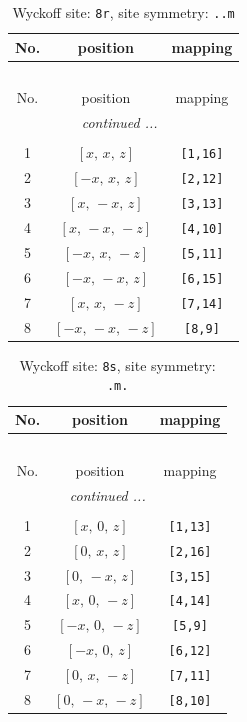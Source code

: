 \documentclass[fleqn,8pt]{jsarticle}
\begin{document}
\begin{longtable}{ccc}
\caption{Wyckoff site: {\tt 8r}, site symmetry: {\tt ..m}}
 \\
 \hline \hline
No. & position & mapping \\ \hline \endfirsthead

\multicolumn{2}{l}{\tablename\ \thetable{}} \\
 \hline \hline
No. & position & mapping \\ \hline \endhead

 \hline \hline
\multicolumn{2}{r}{\footnotesize\it continued ...} \\ \endfoot

 \hline \hline
\multicolumn{2}{r}{} \\ \endlastfoot

1 & $\left[ x,\, x,\, z \right]$ & {\tt [1,16]} \\ \hline
2 & $\left[ - x,\, x,\, z \right]$ & {\tt [2,12]} \\ \hline
3 & $\left[ x,\, - x,\, z \right]$ & {\tt [3,13]} \\ \hline
4 & $\left[ x,\, - x,\, - z \right]$ & {\tt [4,10]} \\ \hline
5 & $\left[ - x,\, x,\, - z \right]$ & {\tt [5,11]} \\ \hline
6 & $\left[ - x,\, - x,\, z \right]$ & {\tt [6,15]} \\ \hline
7 & $\left[ x,\, x,\, - z \right]$ & {\tt [7,14]} \\ \hline
8 & $\left[ - x,\, - x,\, - z \right]$ & {\tt [8,9]} \\
\end{longtable}
\renewcommand{\arraystretch}{1.2}
\begin{longtable}{ccc}
\caption{Wyckoff site: {\tt 8s}, site symmetry: {\tt .m.}}
 \\
 \hline \hline
No. & position & mapping \\ \hline \endfirsthead

\multicolumn{2}{l}{\tablename\ \thetable{}} \\
 \hline \hline
No. & position & mapping \\ \hline \endhead

 \hline \hline
\multicolumn{2}{r}{\footnotesize\it continued ...} \\ \endfoot

 \hline \hline
\multicolumn{2}{r}{} \\ \endlastfoot

1 & $\left[ x,\, 0,\, z \right]$ & {\tt [1,13]} \\ \hline
2 & $\left[ 0,\, x,\, z \right]$ & {\tt [2,16]} \\ \hline
3 & $\left[ 0,\, - x,\, z \right]$ & {\tt [3,15]} \\ \hline
4 & $\left[ x,\, 0,\, - z \right]$ & {\tt [4,14]} \\ \hline
5 & $\left[ - x,\, 0,\, - z \right]$ & {\tt [5,9]} \\ \hline
6 & $\left[ - x,\, 0,\, z \right]$ & {\tt [6,12]} \\ \hline
7 & $\left[ 0,\, x,\, - z \right]$ & {\tt [7,11]} \\ \hline
8 & $\left[ 0,\, - x,\, - z \right]$ & {\tt [8,10]} \\
\end{longtable}
\end{document}
